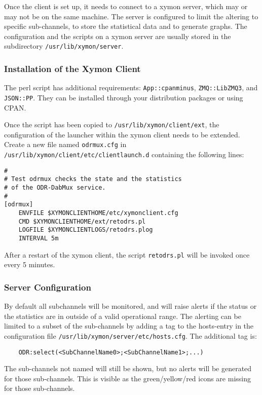Once the client is set up, it needs to connect to a xymon server, which may or
may not be on the same machine.
The server is configured to limit the altering to specific sub-channels, to
store the statistical data and to generate graphs.
The configuration and the scripts on a xymon server are usually stored in the
subdirectory \verb+/usr/lib/xymon/server+.


\subsubsection{Installation of the Xymon Client}

The perl script has additional requirements:
\texttt{App::cpanminus}, \texttt{ZMQ::LibZMQ3}, and \texttt{JSON::PP}. They can
be installed through your distribution packages or using CPAN.

Once the script has been copied to \verb+/usr/lib/xymon/client/ext+, the
configuration of the launcher within the xymon client needs to be extended.
Create a new file named \verb+odrmux.cfg+ in
\verb+/usr/lib/xymon/client/etc/clientlaunch.d+ containing the following lines:

\begin{verbatim}
#
# Test odrmux checks the state and the statistics
# of the ODR-DabMux service.
#
[odrmux]
	ENVFILE $XYMONCLIENTHOME/etc/xymonclient.cfg
	CMD $XYMONCLIENTHOME/ext/retodrs.pl
	LOGFILE $XYMONCLIENTLOGS/retodrs.plog
	INTERVAL 5m
\end{verbatim}

After a restart of the xymon client, the script \verb+retodrs.pl+ will
be invoked once every 5 minutes.


\subsubsection{Server Configuration}

By default all subchannels will be monitored, and will raise alerts if the
status or the statistics are in outside of a valid operational range. The
alerting can be limited to a subset of the sub-channels by adding a tag to the
hosts-entry in the configuration file \verb+/usr/lib/xymon/server/etc/hosts.cfg+.
The additional tag is:

\begin{verbatim}
	ODR:select(<SubChannelName0>;<SubChannelName1>;...)
\end{verbatim}

The sub-channels not named will still be shown, but no alerts will be generated
for those sub-channels. This is visible as the green/yellow/red icons are
missing for those sub-channels.

